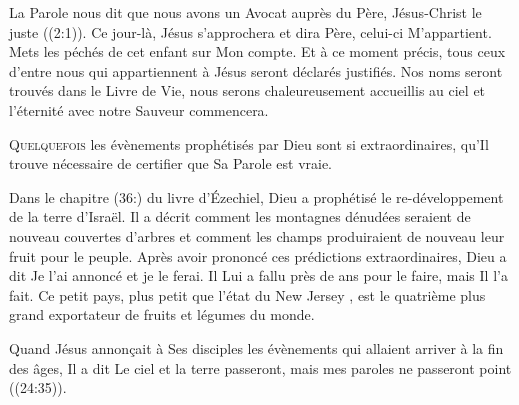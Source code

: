
La Parole nous dit que \Og nous
 avons un Avocat auprès du Père, Jésus-Christ le juste \Fg{}
 ((2:1)).
 Ce jour-là, Jésus s'approchera et dira\frcolon{} 
 \Og Père, celui-ci M'appartient. Mets les péchés de cet enfant
 sur Mon compte. \Fg{}
 Et à ce moment précis, tous ceux d'entre nous qui appartiennent à Jésus
 seront déclarés justifiés. Nos noms seront trouvés dans le Livre de Vie,
 nous serons chaleureusement accueillis au ciel et l'éternité
 avec notre Sauveur commencera. 

\dvrule







\lettrine{Q}{uelquefois} les évènements prophétisés par Dieu
 sont si extraordinaires, qu'Il trouve nécessaire de certifier
 que Sa Parole est vraie. 

Dans le chapitre (36:) du livre d'Ézechiel, Dieu a prophétisé
 le re-développement de la terre d'Israël.
 Il a décrit comment les montagnes dénudées seraient de nouveau couvertes
 d'arbres et comment les 
 champs produiraient de nouveau leur fruit pour le peuple.
 Après avoir prononcé ces prédictions extraordinaires,
 Dieu a dit\frcolon{} 
 \Og Je l'ai annoncé et je le ferai. \Fg{}
 Il Lui a fallu près de  ans pour le faire, mais Il l'a fait.
 Ce petit pays, plus petit que l'état du New Jersey ,
 est le quatrième plus grand exportateur de fruits et légumes du monde. 


Quand Jésus annon\c{c}ait à Ses disciples les évènements
 qui allaient arriver à la fin des âges, Il a dit\frcolon{} 
 \Og Le ciel et la terre passeront, mais mes paroles ne passeront point \Fg{}
 ((24:35)). 

